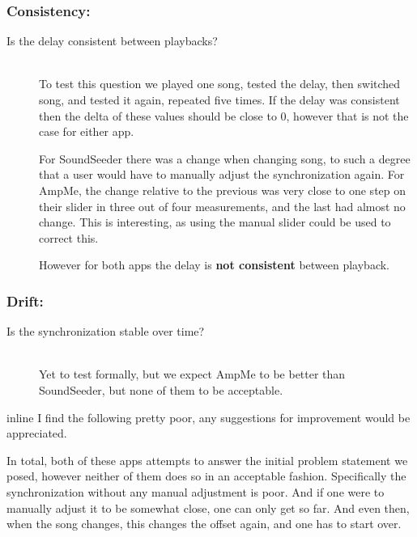 \subsubsection*{Consistency:}
\begin{description}
    \item[Is the delay consistent between playbacks?] \hfill \\
    To test this question we played one song, tested the delay, then switched song, and tested it again, repeated five times. 
    If the delay was consistent then the delta of these values should be close to $0$, however that is not the case for either app. 

    For SoundSeeder there was a change when changing song, to such a degree that a user would have to manually adjust the synchronization again.
    For AmpMe, the change relative to the previous was very close to one step on their slider in three out of four measurements, and the last had almost no change. 
    This is interesting, as using the manual slider could be used to correct this. 

    However for both apps the delay is \textbf{not consistent} between playback.
\end{description}

\subsubsection*{Drift:}
\begin{description}
    \item[Is the synchronization stable over time?] \hfill \\
    Yet to test formally, but we expect AmpMe to be better than SoundSeeder, but none of them to be acceptable. 
\end{description}


\begin{tenote}{inline}
    I find the following pretty poor, any suggestions for improvement would be appreciated. 
\end{tenote}
In total, both of these apps attempts to answer the initial problem statement we posed, however neither of them does so in an acceptable fashion. 
Specifically the synchronization without any manual adjustment is poor. 
And if one were to manually adjust it to be somewhat close, one can only get so far.
And even then, when the song changes, this changes the offset again, and one has to start over.
